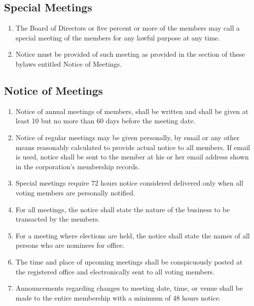 \documentclass{article}
\begin{document}
\subsection{Special Meetings}
\begin{enumerate}
    \item The Board of Directors or five percent or more of the members may call
    a special meeting of the members for any lawful purpose at any time.
    \item Notice must be provided of such meeting as provided in the section of
    these bylaws entitled Notice of Meetings.
\end{enumerate}
\subsection{Notice of Meetings}
\begin{enumerate}
    \item Notice of annual meetings of members, shall be written and shall be
    given at least 10 but no more than 60 days before the meeting date.
    \item Notice of regular meetings may be given personally, by email or any
    other means reasonably calculated to provide actual notice to all members.
    If email is used, notice shall be sent to the member at his or her email
    address shown in the corporation’s membership records.
    \item Special meetings require 72 hours notice considered delivered only
    when all voting members are personally notified.
    \item For all meetings, the notice shall state the nature of the business to
    be transacted by the members.
    \item For a meeting where elections are held, the notice shall state the
    names of all persons who are nominees for office.
    \item The time and place of upcoming meetings shall be conspicuously posted
    at the registered office and electronically sent to all voting members.
    \item Announcements regarding changes to meeting date, time, or venue shall
    be made to the entire membership with a minimum of 48 hours notice.
\end{enumerate}
\end{document}
